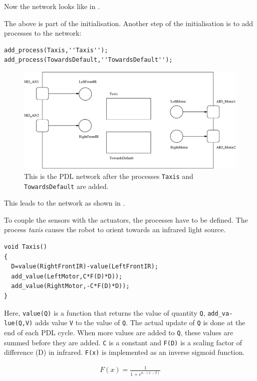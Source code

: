 Now the network looks like in .

The above is part of the initialisation. Another step of the initialisation is to add processes to the network:


{\footnotesize\begin{verbatim}
add_process(Taxis,''Taxis'');
add_process(TowardsDefault,''TowardsDefault'');
\end{verbatim}}

\begin{figure}
\centerline{\includegraphics[width=12cm]{robots//pdl_networkc.eps}}
\caption{This is the PDL network after the processes \texttt{Taxis} and \texttt{TowardsDefault} are added.}
\label{f:robots:pdl_networkc}
\end{figure}


This leads to the network as shown in . 

To couple the sensors with the actuators, the processes have to be defined. The process {\em taxis} causes the robot to orient towards an infrared light source.


{\footnotesize\begin{verbatim}
void Taxis()
{
  D=value(RightFrontIR)-value(LeftFrontIR);
  add_value(LeftMotor,C*F(D)*D));
  add_value(RightMotor,-C*F(D)*D));
}
\end{verbatim}}


Here, \texttt{value(Q)} is a function that returns the value of quantity \texttt{Q}, {\tt add\_va-lue(Q,V)} adds value \texttt{V} to the value of \texttt{Q}. The actual update of \texttt{Q} is done at the end of each PDL cycle. When more values are added to \texttt{Q}, these values are summed before they are added. \texttt{C} is a constant and \texttt{F(D)} is a scaling factor of difference (D) in infrared. \texttt{F(x)} is implemented as an inverse sigmoid function.

\begin{eqnarray*}
F(x)=\frac{1}{1+e^{\alpha \cdot (x - \beta)}}
\end{eqnarray*}

